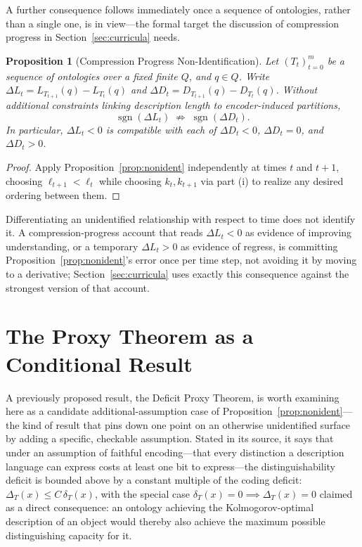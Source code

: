 \documentclass[11pt]{article}
\theoremstyle{plain}
\newtheorem{proposition}{Proposition}
\begin{document}
A further consequence follows immediately once a sequence of ontologies, rather than a single one, is in view---the formal target the discussion of compression progress in Section~\ref{sec:curricula} needs.

\begin{proposition}[Compression Progress Non-Identification]
\label{prop:dynamic}
Let $(T_t)_{t=0}^{m}$ be a sequence of ontologies over a fixed finite $Q$, and $q \in Q$. Write $\Delta L_t = L_{T_{t+1}}(q) - L_{T_t}(q)$ and $\Delta D_t = D_{T_{t+1}}(q) - D_{T_t}(q)$. Without additional constraints linking description length to encoder-induced partitions,
\[
\operatorname{sgn}(\Delta L_t) \; \not\Rightarrow \; \operatorname{sgn}(\Delta D_t).
\]
In particular, $\Delta L_t < 0$ is compatible with each of $\Delta D_t < 0$, $\Delta D_t = 0$, and $\Delta D_t > 0$.
\end{proposition}

\begin{proof}
Apply Proposition~\ref{prop:nonident} independently at times $t$ and $t+1$, choosing $\ell_{t+1} < \ell_t$ while choosing $k_t, k_{t+1}$ via part (i) to realize any desired ordering between them.
\end{proof}

Differentiating an unidentified relationship with respect to time does not identify it. A compression-progress account that reads $\Delta L_t < 0$ as evidence of improving understanding, or a temporary $\Delta L_t > 0$ as evidence of regress, is committing Proposition~\ref{prop:nonident}'s error once per time step, not avoiding it by moving to a derivative; Section~\ref{sec:curricula} uses exactly this consequence against the strongest version of that account.

\section{The Proxy Theorem as a Conditional Result}
\label{sec:proxy}

A previously proposed result, the Deficit Proxy Theorem, is worth examining here as a candidate additional-assumption case of Proposition~\ref{prop:nonident}---the kind of result that pins down one point on an otherwise unidentified surface by adding a specific, checkable assumption. Stated in its source, it says that under an assumption of faithful encoding---that every distinction a description language can express costs at least one bit to express---the distinguishability deficit is bounded above by a constant multiple of the coding deficit: $\Delta_T(x) \le C\,\delta_T(x)$, with the special case $\delta_T(x) = 0 \implies \Delta_T(x) = 0$ claimed as a direct consequence: an ontology achieving the Kolmogorov-optimal description of an object would thereby also achieve the maximum possible distinguishing capacity for it.
\end{document}

